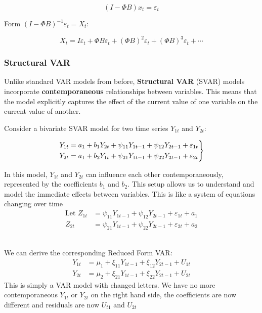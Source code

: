 \[
(I - \Phi B) x_t = \varepsilon_t
\]

Form \((I - \Phi B)^{-1} \varepsilon_t = X_t\):

\[
X_t = I \varepsilon_t + \Phi B \varepsilon_t + (\Phi B)^2 \varepsilon_t + (\Phi B)^3 \varepsilon_t + \cdots
\]

\subsubsection{Structural VAR}

Unlike standard VAR models from before, \textbf{Structural VAR} (SVAR) models incorporate \textbf{contemporaneous} relationships between variables. This means that the model explicitly captures the effect of the current value of one variable on the current value of another. 

Consider a bivariate SVAR model for two time series $Y_{1t}$ and $Y_{2t}$: 

\begin{equation}
\begin{array}{r@{}l}
& \left.
\begin{aligned}
    Y_{1t} &= a_1 + b_1Y_{2t} + \psi_{11} Y_{1t-1} + \psi_{12} Y_{2t-1} + \varepsilon_{1t} \\
    Y_{2t} &=  a_1 + b_2 Y_{1t} + \psi_{21} Y_{1t-1} + \psi_{22} Y_{2t-1} + \varepsilon_{2t} \label{structural}
\end{aligned}
\right\}
\end{array}
\end{equation}

In this model, $Y_{1t}$ and $Y_{2t}$ can influence each other contemporaneously, represented by the coefficients $b_1$ and $b_2$. This setup allows us to understand and model the immediate effects between variables. This is like a system of equations changing over time
\begin{align*}
    \text{Let } Z_{1t} &= \psi_{11}Y_{1t-1}+\psi_{12}Y_{2t-1} +\varepsilon_{1t} + a_1 \\
    Z_{2t} &= \psi_{21} Y_{1t-1} + \psi_{22} Y_{2t-1} + \varepsilon_{2t} + a_2
\end{align*}

 \\

We can derive the corresponding Reduced Form VAR:
\begin{align*}
    Y_{1t} &= \mu_1 + \xi_{11} Y_{1t-1} + \xi_{12} Y_{2t-1} + U_{1t}\\
    Y_{2t} &= \mu_2 + \xi_{21} Y_{1t-1} + \xi_{22} Y_{2t-1} + U_{2t}
\end{align*}
This is simply a VAR model with changed letters. We have no more contemporaneous $Y_{1t}$ or $Y_{2t}$ on the right hand side, the coefficients are now different and residuals are now $U_{t1}$ and $U_{2t}$\\

